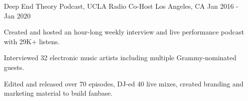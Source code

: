 \begin{cventries}
\cventry
{Deep End Theory Podcast, UCLA Radio}
{Co-Host}
{Los Angeles, CA}
{Jan 2016 - Jan 2020}
{
\begin{cvitems}
\item Created and hosted an hour-long weekly interview and live performance podcast with 29K+ listens.
\item Interviewed 32 electronic music artists including multiple Grammy-nominated guests.
\item Edited and released over 70 episodes, DJ-ed 40 live mixes, created branding and marketing material to build fanbase.
\end{cvitems}
}

\end{cventries}